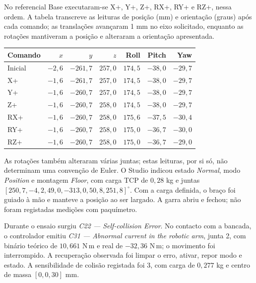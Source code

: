 No referencial Base executaram-se X+, Y+, Z+, RX+, RY+ e RZ+, nessa ordem. A tabela transcreve as leituras de posição (mm) e orientação (graus) após cada comando; as translações avançaram 1 mm no eixo solicitado, enquanto as rotações mantiveram a posição e alteraram a orientação apresentada.
\begin{center}\small
\begin{tabular}{@{}lrrrrrr@{}}\toprule
Comando & $x$ & $y$ & $z$ & Roll & Pitch & Yaw\\\midrule
Inicial & $-2{,}6$ & $-261{,}7$ & $257{,}0$ & $174{,}5$ & $-38{,}0$ & $-29{,}7$\\
X+ & $-1{,}6$ & $-261{,}7$ & $257{,}0$ & $174{,}5$ & $-38{,}0$ & $-29{,}7$\\
Y+ & $-1{,}6$ & $-260{,}7$ & $257{,}0$ & $174{,}5$ & $-38{,}0$ & $-29{,}7$\\
Z+ & $-1{,}6$ & $-260{,}7$ & $258{,}0$ & $174{,}5$ & $-38{,}0$ & $-29{,}7$\\
RX+ & $-1{,}6$ & $-260{,}7$ & $258{,}0$ & $175{,}6$ & $-37{,}5$ & $-30{,}4$\\
RY+ & $-1{,}6$ & $-260{,}7$ & $258{,}0$ & $175{,}0$ & $-36{,}7$ & $-30{,}0$\\
RZ+ & $-1{,}6$ & $-260{,}7$ & $258{,}0$ & $175{,}0$ & $-36{,}7$ & $-29{,}0$\\\bottomrule
\end{tabular}
\end{center}
As rotações também alteraram várias juntas; estas leituras, por si só, não determinam uma convenção de Euler. O Studio indicou estado \emph{Normal}, modo \emph{Position} e montagem \emph{Floor}, com carga TCP de $0{,}28$ kg e juntas $[250{,}7,-4{,}2,49{,}0,-313{,}0,50{,}8,251{,}8]^\circ$. Com a carga definida, o braço foi guiado à mão e manteve a posição ao ser largado. A garra abriu e fechou; não foram registadas medições com paquímetro.

Durante o ensaio surgiu \emph{C22 — Self-collision Error}. No contacto com a bancada, o controlador emitiu \emph{C31 — Abnormal current in the robotic arm}, junta 2, com binário teórico de $10{,}661$ N\,m e real de $-32{,}36$ N\,m; o movimento foi interrompido. A recuperação observada foi limpar o erro, ativar, repor modo e estado. A sensibilidade de colisão registada foi 3, com carga de $0{,}277$ kg e centro de massa $[0,0,30]$ mm.

